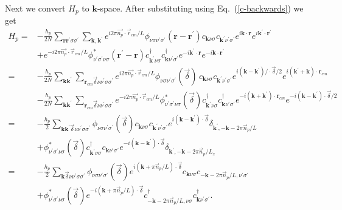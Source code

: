 Next we convert $H_p$ to $\mathbf{k}$-space.  After substituting
using Eq.~(\ref{c-backwards}) we get
\begin{equation}
\begin{split}
H_p = & - \frac{h_p}{2N} \sum_{\mathbf{r}\mathbf{r}^{\prime}\sigma\sigma^{\prime}} 
\sum_{\mathbf{k},\mathbf{k}^{\prime}}
e^{i 2 \pi \vec{n_p}\cdot \vec{r}_{cm}/L}
\phi_{\nu\sigma\nu^{\prime}\sigma^{\prime}}(\mathbf{r} - \mathbf{r}^{\prime})
c_{\mathbf{k}\nu\sigma} c_{\mathbf{k}^{\prime}\nu^{\prime}\sigma^{\prime}}
e^{i \mathbf{k}\cdot\mathbf{r}} e^{i \mathbf{k}^{\prime}\cdot
\mathbf{r}^{\prime}} 
\\
& + e^{-i 2 \pi \vec{n_p}\cdot \vec{r}_{cm}/L} 
\phi_{\nu^{\prime}\sigma^{\prime}\nu\sigma}^*(\mathbf{r}^{\prime} - \mathbf{r})
 c^{\dagger}_{\mathbf{k}^{\prime}\nu\sigma}
 c^{\dagger}_{\mathbf{k}\nu^{\prime}\sigma^{\prime}} 
e^{-i\mathbf{k}^{\prime}\cdot\mathbf{r}}
 e^{-i \mathbf{k}\cdot \mathbf{r}^{\prime}}  \\
 = & -\frac{h_p}{2N} 
 \sum_{\mathbf{k}\mathbf{k}^{\prime}}
 \sum_{\mathbf{r}_{cm} \vec{\delta}\nu\nu^{\prime}\sigma\sigma^{\prime}}
e^{i 2 \pi \vec{n_p}\cdot \vec{r}_{cm}/L} 
\phi_{\nu\sigma\nu^{\prime}\sigma^{\prime}}(\vec{\delta})\,
 c_{\mathbf{k}\nu\sigma} c_{\mathbf{k}^{\prime}\nu^{\prime}\sigma^{\prime}}
 e^{i(\mathbf{k}-\mathbf{k}^{\prime})/\cdot \vec{\delta}/2} 
 e^{i (\mathbf{k}^{\prime}+\mathbf{k})\cdot \mathbf{r}_{cm}}  \\
 & 
 -\frac{h_p}{2N} 
 \sum_{\mathbf{k}\mathbf{k}^{\prime}}
 \sum_{\mathbf{r}_{cm}\vec{\delta}\nu\nu^{\prime}\sigma\sigma^{\prime}} 
  e^{-i 2 \pi \vec{n_p}\cdot \vec{r}_{cm}/L}
\phi_{\nu^{\prime}\sigma^{\prime}\nu\sigma}^*(\vec{\delta})
 c^{\dagger}_{\mathbf{k}^{\prime}\nu\sigma}
 c^{\dagger}_{\mathbf{k}\nu^{\prime}\sigma^{\prime}}
 e^{-i(\mathbf{k}+\mathbf{k}^{\prime})\cdot \mathbf{r}_{cm}}
 e^{-i(\mathbf{k}-\mathbf{k}^{\prime})\cdot\vec{\delta}/2}  \\
= & -\frac{h_p}{2}
\sum_{\mathbf{k}\mathbf{k}^{\prime}\vec{\delta}\nu\nu^{\prime}\sigma\sigma^{\prime}}
\phi_{\nu\sigma\nu^{\prime}\sigma^{\prime}}(\vec{\delta}) c_{\mathbf{k}\nu\sigma}
c_{\mathbf{k}^{\prime}\nu^{\prime}\sigma^{\prime}} 
e^{i(\mathbf{k}-\mathbf{k}^{\prime})\cdot\vec{\delta}}
\delta_{\mathbf{k}^{\prime},-\mathbf{k}- 2 \pi \vec{n}_p /L} \\
& + \phi_{\nu^{\prime}\sigma^{\prime}\nu\sigma}^*(\vec{\delta})
c^{\dagger}_{\mathbf{k}^{\prime}\nu\sigma}
c_{\mathbf{k}\nu^{\prime}\sigma^{\prime}} 
e^{-i (\mathbf{k}-\mathbf{k}^{\prime})\cdot\vec{\delta}}
\delta_{\mathbf{k}^{\prime},-\mathbf{k} - 2\pi \vec{n}_p /L_x}  \\
= & - \frac{h_p}{2} \sum_{\mathbf{k}\vec{\delta}\nu\nu^{\prime}\sigma\sigma^{\prime}}
\phi_{\nu\sigma\nu^{\prime}\sigma^{\prime}}(\vec{\delta})
e^{i (\mathbf{k}+ \pi\vec{n}_p/L)\cdot \vec{\delta}}
c_{\mathbf{k}\nu\sigma} 
c_{-\mathbf{k} - 2 \pi \vec{n}_p / L,\nu^{\prime}\sigma^{\prime}} \\
& + \phi_{\nu^{\prime}\sigma^{\prime}\nu\sigma}^*(\vec{\delta})
e^{-i (\mathbf{k}+ \pi\vec{n}_p/L)\cdot \vec{\delta}}  
c^{\dagger}_{-\mathbf{k} -2 \pi \vec{n}_p / L,\nu\sigma}
c^{\dagger}_{\mathbf{k}\nu^{\prime}\sigma^{\prime}}.
\end{split}
\end{equation}
